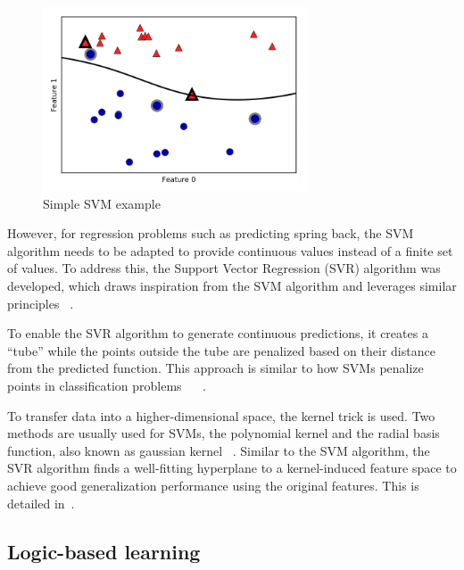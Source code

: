 {\begin{figure}[H]
    \begin{tcolorbox}[arc=0pt,boxrule=0.5pt]
        \centering
        \includegraphics[width=0.7\textwidth]{chap4/images/svm_example}
    \end{tcolorbox}
    \caption{Simple \ac{SVM} example~\cite[p. 94]{muller_introductionmachinelearning_2016}}
    \label{fig:svm-example}
\end{figure}

However, for regression problems such as predicting spring back, the \ac{SVM} algorithm
needs to be adapted to provide continuous values instead of a finite set of values.
To address this, the Support Vector Regression (SVR) algorithm was developed, which draws inspiration from the
\ac{SVM} algorithm and leverages similar principles
~\cite[p. 92]{muller_introductionmachinelearning_2016}.

To enable the \ac{SVR} algorithm to generate continuous predictions, it creates a ``tube''
while the points outside the tube are penalized based on their distance from the
predicted function.
This approach is similar to how \ac{SVM}s penalize points in classification
problems
~\cite[p. 369]{montesinoslopez_supportvectormachines_2022}
~\cite[pp. 67--68]{awad_efficientlearningmachines_2015}.

To transfer data into a higher-dimensional space, the kernel trick is used.
Two methods are usually used for \ac{SVM}s, the polynomial kernel and the radial basis
function, also known as gaussian kernel
~\cite[p. 97--98]{muller_introductionmachinelearning_2016}.
Similar to the \ac{SVM} algorithm, the \ac{SVR} algorithm finds a well-fitting hyperplane to a
kernel-induced feature space to achieve good generalization performance using the original
features.
This is detailed in~\cite[p. 369]{montesinoslopez_supportvectormachines_2022}.

\subsection{Logic-based learning}\label{subsec:logic-based-learning}

}
